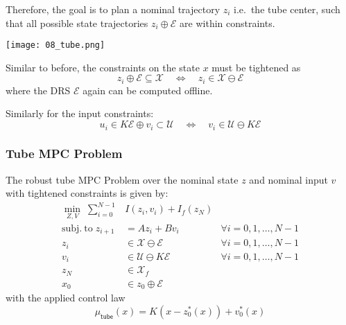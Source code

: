 \newpar{}
Therefore, the goal is to plan a nominal trajectory $z_i$ i.e.\ the tube center, such that all possible state trajectories $z_i\oplus \mathcal{E}$ are within constraints.

\begin{center}
    \texttt{[image: 08\_tube.png]}
\end{center}

\newpar{}

Similar to before, the constraints on the state $x$ must be tightened as
\begin{equation*}
    z_i \oplus \mathcal{E} \subseteq \mathcal{X} \quad \Leftrightarrow \quad z_i \in \mathcal{X}\ominus \mathcal{E}
\end{equation*}
where the DRS $\mathcal{E}$ again can be computed offline.

\newpar{}
Similarly for the input constraints:
\begin{equation*}
    u_i \in K \mathcal{E} \oplus v_i \subset \mathcal{U}\quad \Leftrightarrow \quad v_i \in \mathcal{U} \ominus K\mathcal{E}
\end{equation*}

\subsubsection{Tube MPC Problem}
The robust tube MPC Problem over the nominal state $z$ and nominal input $v$ with tightened constraints is given by:
\begin{align*}
    \min_{Z,V}\;         \sum_{i=0}^{N-1}                                                                & I(z_{i},v_{i})+I_{f}(z_{N})                                      \\
    \mathrm{subj.~to }\;                                                                         z_{i+1} & =Az_{i}+Bv_{i}                     & \forall i=0, 1, \ldots, N-1 \\
    z_{i}                                                                                                & \in\mathcal{X}\ominus\mathcal{E}   & \forall i=0, 1, \ldots, N-1 \\
    v_i                                                                                                  & \in\mathcal{U}\ominus K\mathcal{E} & \forall i=0, 1, \ldots, N-1 \\
    z_N                                                                                                  & \in \mathcal{X}_f                                                \\
    x_0                                                                                                  & \in z_0 \oplus \mathcal{E}
\end{align*}
with the applied control law
\begin{equation*}
    \mu_{\mathsf{tube}}(x) = K(x - z_0^*(x)) + v_0^*(x)
\end{equation*}

